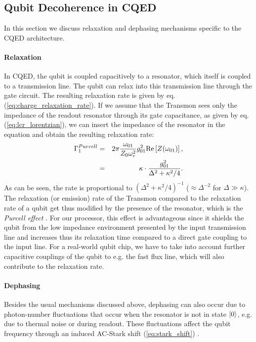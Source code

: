 \subsection{Qubit Decoherence in CQED} \label{section:decoherence_in_cqed}

In this section we discuss relaxation and dephasing mechanisms specific to the CQED architecture.

\paragraph{Relaxation}

In CQED, the qubit is coupled capacitively to a resonator, which itself is coupled to a transmission line. The qubit can relax into this transmission line through the gate circuit. The resulting relaxation rate is given by eq. (\ref{eq:charge_relaxation_rate}). If we assume that the Transmon sees only the impedance of the readout resonator through its gate capacitance, as given by eq. (\ref{eq:lcr_lorentzian}), we can insert the impedance of the resonator in the equation and obtain the resulting relaxation rate:
%
\begin{eqnarray}
\Gamma_1^{Purcell} & = & 2\pi\frac{\omega_{01}}{Z_0 \omega_r^2}g_{01}^2 \mathrm{Re}\left[Z(\omega_{01})\right], \notag \\
                & = & \kappa\cdot\frac{g_{01}^2}{\Delta^2+\kappa^2/4}. \label{eq:purcell_rate}
\end{eqnarray}
%
As can be seen, the rate is proportional to $(\Delta^2+\kappa^2/4)^{-1}$ ($\approx\Delta^{-2}$ for $\Delta \gg \kappa$). The relaxation (or emission) rate of the Transmon compared to the relaxation rate of a qubit get thus modified by the presence of the resonator, which is the {\it Purcell effect} \citep{purcell_spontaneous_1946}. For our processor, this effect is advantageous since it shields the qubit from the low impedance environment presented by the input transmission line and increases thus its relaxation time compared to a direct gate coupling to the input line. For a real-world qubit chip, we have to take into account further capacitive couplings of the qubit to e.g. the fast flux line, which will also contribute to the relaxation rate.

\paragraph{Dephasing} Besides the usual mechanisms discussed above, dephasing can also occur due to photon-number fluctuations that occur when the resonator is not in state $\left| 0 \right>$, e.g. due to thermal noise or during readout. These fluctuations affect the qubit frequency through an induced AC-Stark shift (\ref{eq:stark_shift}) \citep{bertet_dephasing_2005,bertet_dephasing_2005-1,rigetti_superconducting_2012}.

